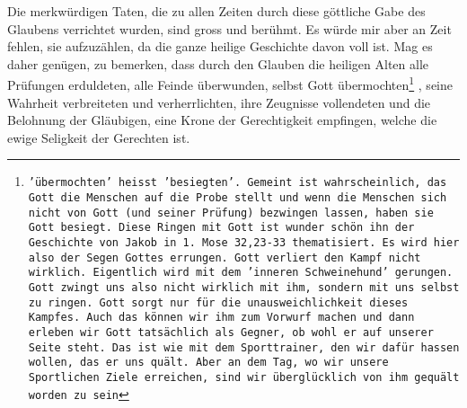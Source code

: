 Die merkwürdigen Taten, die zu allen Zeiten durch diese göttliche Gabe des
Glaubens verrichtet wurden, sind gross und berühmt. Es würde mir aber an Zeit
fehlen, sie aufzuzählen, da die ganze heilige Geschichte davon voll ist. Mag es
daher genügen, zu bemerken, dass durch den Glauben die heiligen Alten alle
Prüfungen erduldeten, alle Feinde überwunden, selbst Gott
übermochten\footnote{\texttt{'übermochten' heisst 'besiegten'. Gemeint ist
wahrscheinlich, das Gott die Menschen auf die Probe stellt und wenn die Menschen
sich nicht von Gott (und seiner Prüfung) bezwingen lassen, haben sie Gott
besiegt. Diese Ringen mit Gott ist wunder schön ihn der Geschichte von Jakob in
1. Mose 32,23-33 thematisiert. Es wird hier also der Segen Gottes
errungen. Gott verliert den Kampf nicht wirklich. Eigentlich wird
mit dem 'inneren Schweinehund' gerungen. Gott zwingt uns also nicht
wirklich mit ihm, sondern mit uns selbst zu ringen. Gott sorgt
nur für die unausweichlichkeit dieses Kampfes. Auch das können
wir ihm zum Vorwurf machen und dann erleben wir Gott tatsächlich
als Gegner, ob wohl er auf unserer Seite steht. Das ist wie mit
dem Sporttrainer, den wir dafür hassen wollen, das er uns quält.
Aber an dem Tag, wo wir unsere Sportlichen Ziele erreichen, sind
wir überglücklich von ihm gequält worden zu sein}}
, seine
Wahrheit verbreiteten und verherrlichten, ihre
Zeugnisse vollendeten und die
Belohnung der Gläubigen, eine Krone der
Gerechtigkeit empfingen, welche die
ewige Seligkeit der Gerechten ist.





